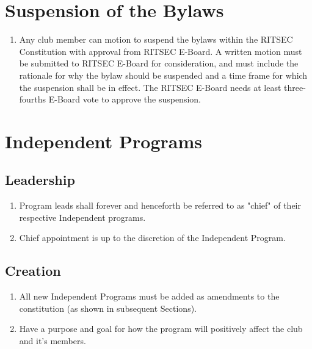 \documentclass{article}
\begin{document}
\section{Suspension of the Bylaws}

\begin{enumerate}
  \item Any club member can motion to suspend the bylaws within the RITSEC
    Constitution with approval from RITSEC E-Board. A written motion must be
    submitted to RITSEC E-Board for consideration, and must include the
    rationale for why the bylaw should be suspended and a time frame for which
    the suspension shall be in effect. The RITSEC E-Board needs at least
    three-fourths E-Board vote to approve the suspension.
\end{enumerate}


\section{Independent Programs}

\subsection{Leadership}

\begin{enumerate}
  \item Program leads shall forever and henceforth be referred to as "chief" of
    their respective Independent programs.
  \item Chief appointment is up to the discretion of the Independent Program.
\end{enumerate}

\subsection{Creation}

\begin{enumerate}
  \item All new Independent Programs must be added as amendments to the
    constitution (as shown in subsequent Sections).
  \item Have a purpose and goal for how the program will positively affect the
    club and it’s members.
\end{enumerate}
\end{document}
